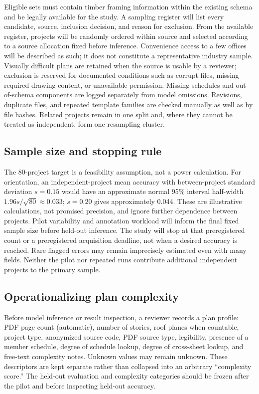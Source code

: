 \documentclass[11pt]{article}
\begin{document}
Eligible sets must contain timber framing information within the existing schema and be legally available for the study. A sampling register will list every candidate, source, inclusion decision, and reason for exclusion. From the available register, projects will be randomly ordered within source and selected according to a source allocation fixed before inference. Convenience access to a few offices will be described as such; it does not constitute a representative industry sample. Visually difficult plans are retained when the source is usable by a reviewer; exclusion is reserved for documented conditions such as corrupt files, missing required drawing content, or unavailable permission. Missing schedules and out-of-schema components are logged separately from model omissions. Revisions, duplicate files, and repeated template families are checked manually as well as by file hashes. Related projects remain in one split and, where they cannot be treated as independent, form one resampling cluster.

\subsection{Sample size and stopping rule}
The 80-project target is a feasibility assumption, not a power calculation. For orientation, an independent-project mean accuracy with between-project standard deviation $s=0.15$ would have an approximate normal 95\% interval half-width $1.96s/\sqrt{80}\approx0.033$; $s=0.20$ gives approximately 0.044. These are illustrative calculations, not promised precision, and ignore further dependence between projects. Pilot variability and annotation workload will inform the final fixed sample size before held-out inference. The study will stop at that preregistered count or a preregistered acquisition deadline, not when a desired accuracy is reached. Rare flagged errors may remain imprecisely estimated even with many fields. Neither the pilot nor repeated runs contribute additional independent projects to the primary sample.

\subsection{Operationalizing plan complexity}

Before model inference or result inspection, a reviewer records a plan profile: PDF page count (automatic), number of stories, roof planes when countable, project type, anonymized source code, PDF source type, legibility, presence of a member schedule, degree of schedule lookup, degree of cross-sheet lookup, and free-text complexity notes. Unknown values may remain unknown. These descriptors are kept separate rather than collapsed into an arbitrary ``complexity score.'' The held-out evaluation and complexity categories should be frozen after the pilot and before inspecting held-out accuracy.
\end{document}
